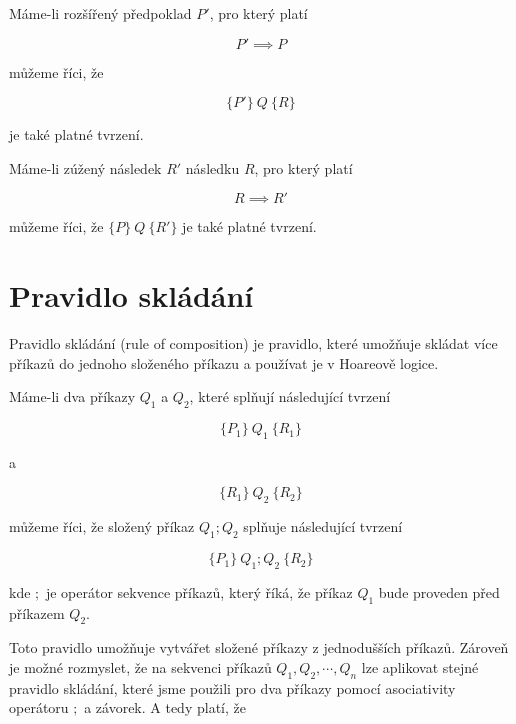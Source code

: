 Máme-li rozšířený předpoklad $P'$, pro který platí

\begin{equation*}
    P' \implies P
\end{equation*}

můžeme říci, že

\begin{equation*}
    \{ P' \} \  Q \  \{ R \}
\end{equation*}

je také platné tvrzení.

Máme-li zúžený následek $R'$ následku $R$, pro který platí

\begin{equation*}
    R \implies R'
\end{equation*}

můžeme říci, že $\{ P \} \  Q \  \{ R' \}$ je také platné tvrzení.

\section{Pravidlo skládání}
\label{sec:hoare-pravidlo-skladani}

Pravidlo skládání (rule of composition) je pravidlo, které umožňuje
skládat více příkazů do jednoho složeného příkazu a používat je v Hoareově logice.

Máme-li dva příkazy $Q_1$ a $Q_2$, které splňují následující tvrzení

\begin{equation*}
    \{ P_1 \} \  Q_1 \  \{ R_1 \}
\end{equation*}

a

\begin{equation*}
    \{ R_1 \} \  Q_2 \  \{ R_2 \}
\end{equation*}

můžeme říci, že složený příkaz $Q_1; Q_2$ splňuje následující tvrzení

\begin{equation*}
    \{ P_1 \} \  Q_1; Q_2 \  \{ R_2 \}
\end{equation*}

kde $;$ je operátor sekvence příkazů, který říká, že příkaz $Q_1$ bude proveden před příkazem $Q_2$.

Toto pravidlo umožňuje vytvářet složené příkazy z jednodušších příkazů.
Zároveň je možné rozmyslet, že na sekvenci příkazů $Q_1, Q_2, \cdots, Q_n$
lze aplikovat stejné pravidlo skládání, které jsme použili pro dva příkazy
pomocí asociativity operátoru $;$ a závorek. A tedy platí, že

